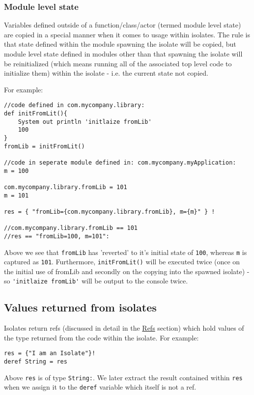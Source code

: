 \documentclass[conc-doc]{subfiles}
\begin{document}
\subsubsection{Module level state}
Variables defined outside of a function/class/actor (termed module level state) are copied in a special manner when it comes to usage within isolates. The rule is that state defined within the module spawning the isolate will be copied, but module level state defined in modules other than that spawning the isolate will be reinitialized (which means running all of the associated top level code to initialize them) within the isolate - i.e. the current state not copied.

For example:

\begin{lstlisting}
//code defined in com.mycompany.library:
def initFromLit(){
	System out println 'initlaize fromLib'
	100
}
fromLib = initFromLit()

//code in seperate module defined in: com.mycompany.myApplication:
m = 100

com.mycompany.library.fromLib = 101
m = 101

res = { "fromLib={com.mycompany.library.fromLib}, m={m}" } !

//com.mycompany.library.fromLib == 101
//res == "fromLib=100, m=101":
\end{lstlisting}

Above we see that \lstinline{fromLib} has 'reverted' to it's initial state of \lstinline{100}, whereas \lstinline{m} is captured as \lstinline{101}. Furthermore, \lstinline{initFromLit()} will be executed twice (once on the initial use of fromLib and secondly on the copying into the spawned isolate) - so \lstinline{'initlaize fromLib'} will be output to the console twice.

\subsection{Values returned from isolates}
Isolates return refs (discussed in detail in the \hyperref[sec:refs]{Refs} section) which hold values of the type returned from the code within the isolate. For example:

\begin{lstlisting}
res = {"I am an Isolate"}!
deref String = res
\end{lstlisting}

Above \lstinline{res} is of type \lstinline{String:}. We later extract the result contained within \lstinline{res} when we assign it to the \lstinline{deref} variable which itself is not a ref.
\end{document}
